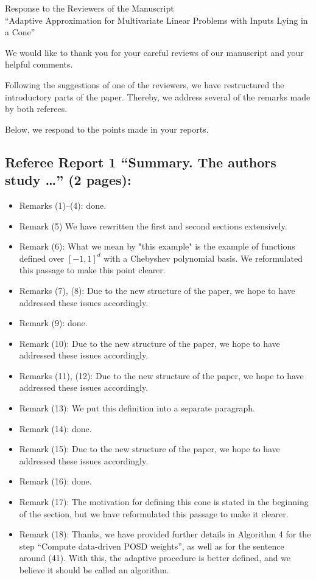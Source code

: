 \documentclass[11pt]{article}
\begin{document}
\begin{center}
 
{\Large Response to the Reviewers of the Manuscript\\
``Adaptive Approximation for Multivariate Linear Problems with Inputs Lying in a Cone''}
\end{center}

\medskip

\noindent We would like to thank you for your careful reviews of our manuscript and your helpful comments. 

Following the suggestions of one of the reviewers, we have restructured the introductory parts of the paper. Thereby, we address several of the remarks 
made by both referees. 

Below, we respond to the points made in your reports.

\subsection*{Referee Report 1 ``Summary. The authors study \ldots '' (2 pages):}

\begin{itemize}
\item Remarks (1)--(4): done. 
\item Remark (5) We have rewritten the first and second sections extensively.
\item Remark (6): What we mean by "this example" is the example of functions defined over $[-1,1]^d$ with a Chebyshev polynomial basis. We reformulated this passage to make this point clearer. 
\item Remarks (7), (8): Due to the new structure of the paper, we hope to have addressed these issues accordingly. 
\item Remark (9): done. 
\item Remark (10): Due to the new structure of the paper, we hope to have addressed these issues accordingly. 
\item Remarks (11), (12): Due to the new structure of the paper, we hope to have addressed these issues accordingly. 
\item Remark (13): We put this definition into a separate paragraph. 
\item Remark (14): done. 
\item Remark (15): Due to the new structure of the paper, we hope to have addressed these issues accordingly. 
\item Remark (16): done. 
\item Remark (17): The motivation for defining this cone is stated in the beginning of the section, but we have reformulated this passage to make it clearer. 
\item Remark (18): Thanks, we have provided further details in Algorithm 4 for the step ``Compute data-driven POSD weights'', as well as for the sentence around (41). With this, the adaptive procedure is better defined, and we believe it should be called an algorithm.
\end{itemize}
\end{document}
